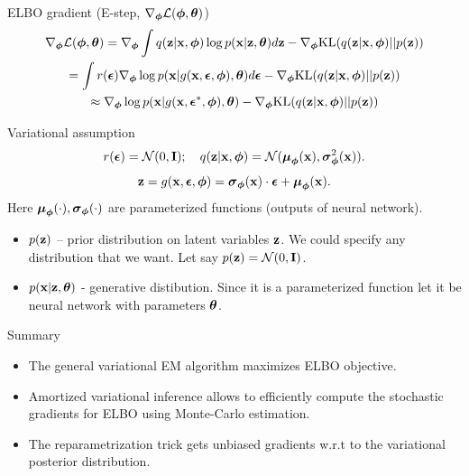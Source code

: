 \begin{frame}{ELBO gradient (E-step, $\nabla_{\boldsymbol{\phi}} \mathcal{L}(\boldsymbol{\phi}, \boldsymbol{\theta})$)}
	\vspace{-0.5cm}
	\begin{multline*}
		\nabla_{\boldsymbol{\phi}} \mathcal{L} (\boldsymbol{\phi}, \boldsymbol{\theta}) = \nabla_{\boldsymbol{\phi}}\int q(\mathbf{z}|\mathbf{x}, \boldsymbol{\phi}) \log p(\mathbf{x}| \mathbf{z}, \boldsymbol{\theta})  d\mathbf{z} - \nabla_{\boldsymbol{\phi}} \text{KL}(q(\mathbf{z} | \mathbf{x}, \boldsymbol{\phi}) || p(\mathbf{z}))
		\\ = \int r(\boldsymbol{\epsilon}) \nabla_{\boldsymbol{\phi}} \log p(\mathbf{x} | g(\mathbf{x}, \boldsymbol{\epsilon}, \boldsymbol{\phi}), \boldsymbol{\theta}) d\boldsymbol{\epsilon}  - \nabla_{\boldsymbol{\phi}} \text{KL}(q(\mathbf{z} | \mathbf{x}, \boldsymbol{\phi}) || p(\mathbf{z}))
		\\ \approx \nabla_{\boldsymbol{\phi}} \log p(\mathbf{x} | g(\mathbf{x}, \boldsymbol{\epsilon}^*, \boldsymbol{\phi}), \boldsymbol{\theta})  - \nabla_{\boldsymbol{\phi}} \text{KL}(q(\mathbf{z} | \mathbf{x}, \boldsymbol{\phi}) || p(\mathbf{z}))
	\end{multline*}
	\vspace{-0.5cm}
	\begin{block}{Variational assumption}
		\vspace{-0.3cm}
		\[
		r(\boldsymbol{\epsilon}) = \mathcal{N}(0, \mathbf{I}); \quad  q(\mathbf{z}| \mathbf{x}, \boldsymbol{\phi}) = \mathcal{N} (\boldsymbol{\mu}_{\boldsymbol{\phi}}(\mathbf{x}), \boldsymbol{\sigma}^2_{\boldsymbol{\phi}}(\mathbf{x})).
		\]
		\[
		\mathbf{z} = g(\mathbf{x}, \boldsymbol{\epsilon}, \boldsymbol{\phi}) = \boldsymbol{\sigma}_{\boldsymbol{\phi}}(\mathbf{x}) \cdot \boldsymbol{\epsilon} + \boldsymbol{\mu}_{\boldsymbol{\phi}}(\mathbf{x}).
		\]
		Here $\boldsymbol{\mu}_{\boldsymbol{\phi}}(\cdot), \boldsymbol{\sigma}_{\boldsymbol{\phi}}(\cdot)$ are parameterized functions (outputs of neural network).
	\end{block}
	\begin{itemize}
		\item $p(\mathbf{z})$ -- prior distribution on latent variables $\mathbf{z}$. We could specify any distribution that we want. Let say $p(\mathbf{z}) = \mathcal{N} (0, \mathbf{I})$.
		\item $p(\mathbf{x} | \mathbf{z}, \boldsymbol{\theta})$ - generative distibution. Since it is a parameterized function let it be neural network with parameters $\boldsymbol{\theta}$.
	\end{itemize}
\end{frame}
\begin{frame}{Summary}
	\begin{itemize}
		\item The general variational EM algorithm maximizes ELBO objective.
		\vfill
		\item Amortized variational inference allows to efficiently compute the stochastic gradients for ELBO using Monte-Carlo estimation.
		\vfill
		\item The reparametrization trick gets unbiased gradients w.r.t to the variational posterior distribution.
	\end{itemize}
\end{frame}
 